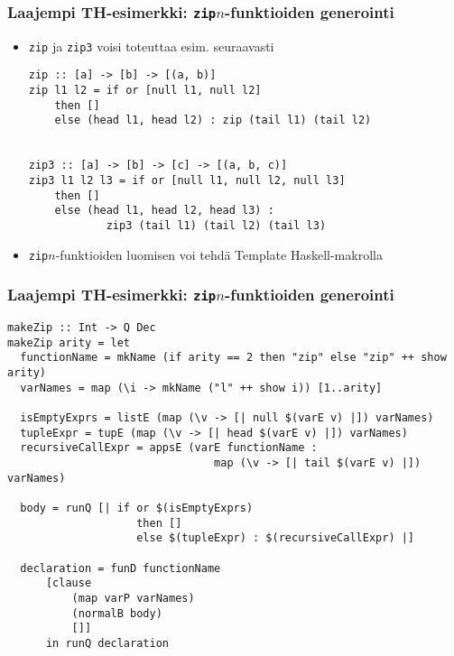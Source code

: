 \documentclass{beamer}
\begin{document}
\begin{frame}[fragile]
\frametitle{Laajempi TH-esimerkki: \texttt{zip$n$}-funktioiden generointi}

\begin{itemize}
\item{\texttt{zip} ja \texttt{zip3} voisi toteuttaa esim. seuraavasti}

\begin{verbatim}
zip :: [a] -> [b] -> [(a, b)]
zip l1 l2 = if or [null l1, null l2]
    then []
    else (head l1, head l2) : zip (tail l1) (tail l2)


zip3 :: [a] -> [b] -> [c] -> [(a, b, c)]
zip3 l1 l2 l3 = if or [null l1, null l2, null l3]
    then []
    else (head l1, head l2, head l3) :
            zip3 (tail l1) (tail l2) (tail l3)
\end{verbatim}

\item{\texttt{zip$n$}-funktioiden luomisen voi tehdä Template Haskell-makrolla}
\end{itemize}
\end{frame}

\begin{frame}[fragile]
\frametitle{Laajempi TH-esimerkki: \texttt{zip$n$}-funktioiden generointi}
\footnotesize
\begin{verbatim}
makeZip :: Int -> Q Dec
makeZip arity = let
  functionName = mkName (if arity == 2 then "zip" else "zip" ++ show arity)
  varNames = map (\i -> mkName ("l" ++ show i)) [1..arity]

  isEmptyExprs = listE (map (\v -> [| null $(varE v) |]) varNames)
  tupleExpr = tupE (map (\v -> [| head $(varE v) |]) varNames)
  recursiveCallExpr = appsE (varE functionName :
                                map (\v -> [| tail $(varE v) |]) varNames)

  body = runQ [| if or $(isEmptyExprs)
                    then []
                    else $(tupleExpr) : $(recursiveCallExpr) |]

  declaration = funD functionName
      [clause
          (map varP varNames)
          (normalB body)
          []]
      in runQ declaration
\end{verbatim}
\end{frame}
\end{document}
